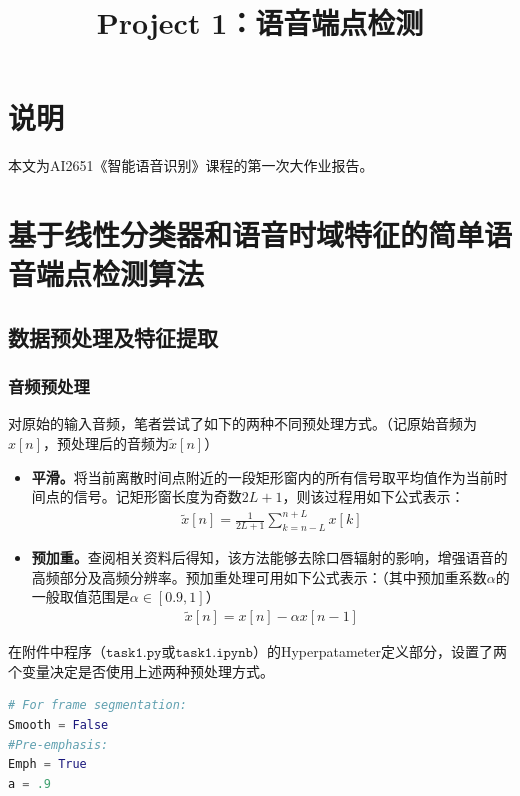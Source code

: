 \documentclass[a4paper]{article}
\title{Project 1：语音端点检测}
\begin{document}
\maketitle

\setcounter{section}{-1}
\section{说明}

本文为AI2651《智能语音识别》课程的第一次大作业报告。

\section{基于线性分类器和语音时域特征的简单语音端点检测算法}

\subsection{数据预处理及特征提取}

\subsubsection{音频预处理}

对原始的输入音频，笔者尝试了如下的两种不同预处理方式。（记原始音频为$x[n]$，预处理后的音频为$\tilde{x}[n]$）

\begin{itemize}
    \item \textbf{平滑。}将当前离散时间点附近的一段矩形窗内的所有信号取平均值作为当前时间点的信号。记矩形窗长度为奇数$2L+1$，则该过程用如下公式表示：
    \begin{align*}
        \tilde{x}[n]=\frac{1}{2L+1}\sum_{k=n-L}^{n+L} x[k]
    \end{align*}
    \item \textbf{预加重。}查阅相关资料\cite{Pre-emphasis}后得知，该方法能够去除口唇辐射的影响，增强语音的高频部分及高频分辨率。预加重处理可用如下公式表示：（其中预加重系数$\alpha$的一般取值范围是$\alpha\in[0.9,1]$）
    \begin{align*}
        \tilde{x}[n]=x[n] - \alpha x[n-1]
    \end{align*}
\end{itemize}

在附件中程序（$\mathtt{task1.py}$或$\mathtt{task1.ipynb}$）的Hyperpatameter定义部分，设置了两个变量决定是否使用上述两种预处理方式。

\begin{lstlisting}[language=python]
# For frame segmentation:
Smooth = False
#Pre-emphasis: 
Emph = True
a = .9
\end{lstlisting}
\end{document}
